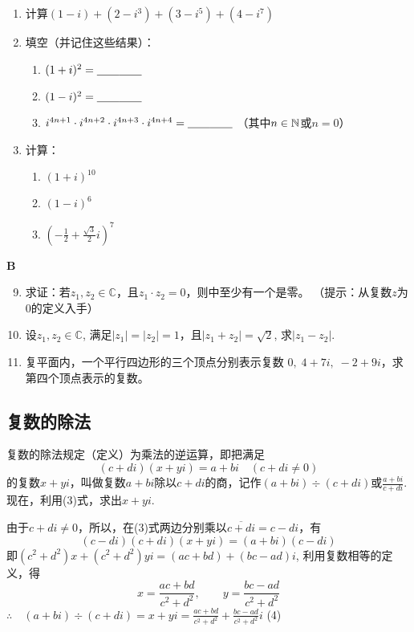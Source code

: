 \begin{enumerate}
\item 计算$(1-i)+(2-i^3)+(3-i^5)+(4-i^7)$
\item 填空（并记住这些结果）：
\begin{enumerate}
    \item $(1+i)^2=\underline{\qquad}\underline{\qquad}$
    \item $(1-i)^2=\underline{\qquad}\underline{\qquad}$
    \item $i^{4n+1}\cdot i^{4n+2}\cdot i^{4n+3}\cdot i^{4n+4} =\underline{\qquad}\underline{\qquad}$ （其中$n\in\mathbb{N}$或$n=0$）
\end{enumerate}
\item 计算：
\begin{multicols}{2}
\begin{enumerate}[(1)]
    \item $(1+i)^{10}$
    \item $(1-i)^6$
    \item $\left(-\frac{1}{2}+\frac{\sqrt{3}}{2}i\right)^7$
\end{enumerate}
\end{multicols}
\end{enumerate}

\begin{center}
    \bfseries B
\end{center}

\begin{enumerate}\setcounter{enumi}{8}
    \item 求证：若$z_1,z_2\in\mathbb{C}$，且$z_1\cdot z_2=0$，则中至少有一个是零。
    （提示：从复数$z$为0的定义入手）
    \item 设$z_1,z_2\in\mathbb{C}$, 满足$|z_1|=|z_2|=1$，且$|z_1+z_2|=\sqrt{2}$, 求$|z_1-z_2|$.
    \item 复平面内，一个平行四边形的三个顶点分别表示复数
    $0,\; 4+7i,\; -2+9i$，求第四个顶点表示的复数。
\end{enumerate}

\subsection{复数的除法}

复数的除法规定（定义）为乘法的逆运算，即把满足
\begin{equation}
  (c+di)(x+yi)=a+bi\quad (c+di\ne 0)  \tag{3}
\end{equation}
的复数$x+yi$，叫做复数$a+bi$除以$c+di$的商，记作$(a+bi)\div (c+di)$或$\frac{a+bi}{c+di}$. 现在，利用(3)式，求出$x+yi$.

由于$c+di\ne 0$，所以，在(3)式两边分别乘以$\overline{c+di}=c-di$，有
\[(c-di)(c+di)(x+yi)=(a+bi)(c-di)\]
即$(c^2+d^2)x+(c^2+d^2)yi=(ac+bd)+(bc-ad)i$,
利用复数相等的定义，得
\[x=\frac{ac+bd}{c^2+d^2},\qquad y=\frac{bc-ad}{c^2+d^2}\]
$\therefore\quad (a+bi)\div (c+di)=x+yi=\frac{ac+bd}{c^2+d^2}+\frac{bc-ad}{c^2+d^2}i$ \hfill(4)

